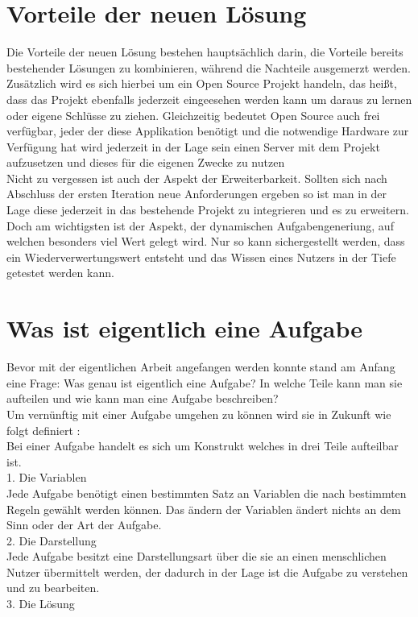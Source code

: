\section{Vorteile der neuen Lösung}

Die Vorteile der neuen Lösung bestehen hauptsächlich darin, die Vorteile bereits bestehender Lösungen zu kombinieren, während die Nachteile ausgemerzt werden. \\

Zusätzlich wird es sich hierbei um ein Open Source Projekt handeln, das heißt, dass das Projekt ebenfalls jederzeit eingeesehen werden kann um daraus zu lernen oder eigene Schlüsse zu ziehen. Gleichzeitig bedeutet Open Source auch frei verfügbar, jeder der diese Applikation benötigt und die notwendige Hardware zur Verfügung hat wird jederzeit in der Lage sein einen Server mit dem Projekt aufzusetzen und dieses für die eigenen Zwecke zu nutzen \\

Nicht zu vergessen ist auch der Aspekt der Erweiterbarkeit. Sollten sich nach Abschluss der ersten Iteration neue Anforderungen ergeben so ist man in der Lage diese jederzeit in das bestehende Projekt zu integrieren und es zu erweitern. \\

Doch am wichtigsten ist der Aspekt, der dynamischen Aufgabengeneriung, auf welchen besonders viel Wert gelegt wird. Nur so kann sichergestellt werden, dass ein Wiederverwertungswert entsteht und das Wissen eines Nutzers in der Tiefe getestet werden kann.

\section{Was ist eigentlich eine Aufgabe}

Bevor mit der eigentlichen Arbeit angefangen werden konnte stand am Anfang eine Frage: Was genau ist eigentlich eine Aufgabe? In welche Teile kann man sie aufteilen und wie kann man eine Aufgabe beschreiben? \\
Um vernünftig mit einer Aufgabe umgehen zu können wird sie in Zukunft wie folgt definiert : \\
Bei einer Aufgabe handelt es sich um Konstrukt welches in drei Teile aufteilbar ist. \\
1. Die Variablen \\
Jede Aufgabe benötigt einen bestimmten Satz an Variablen die nach bestimmten Regeln gewählt werden können. Das ändern der Variablen ändert nichts an dem Sinn oder der Art der Aufgabe.\\
2. Die Darstellung \\
Jede Aufgabe besitzt eine Darstellungsart über die sie an einen menschlichen Nutzer übermittelt werden, der dadurch in der Lage ist die Aufgabe zu verstehen und zu bearbeiten. \\
3. Die Lösung \\




